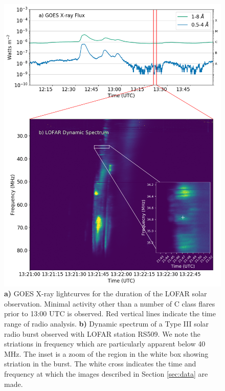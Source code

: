 \begin{figure}
    \centering
    \includegraphics[width=\columnwidth]{Images/Burst_inset_goes_20200730.png}
    \caption[GOES X-ray lightcurves and dynamic spectrum for the duration of a LOFAR solar observation 17 October 2015.]{\textbf{a)} GOES X-ray lightcurves for the duration of the LOFAR solar observation. Minimal activity other than a number of C class flares prior to 13:00 UTC is observed. Red vertical lines indicate the time range of radio analysis. \textbf{b)} Dynamic spectrum of a Type III solar radio burst observed with LOFAR station RS509. We note the striations in frequency which are particularly apparent below 40 MHz. The inset is a zoom of the region in the white box showing striation in the burst. The white cross indicates the time and frequency at which the images described in Section \ref{sec:data} are made.}
    \label{fig:context}
\end{figure}

